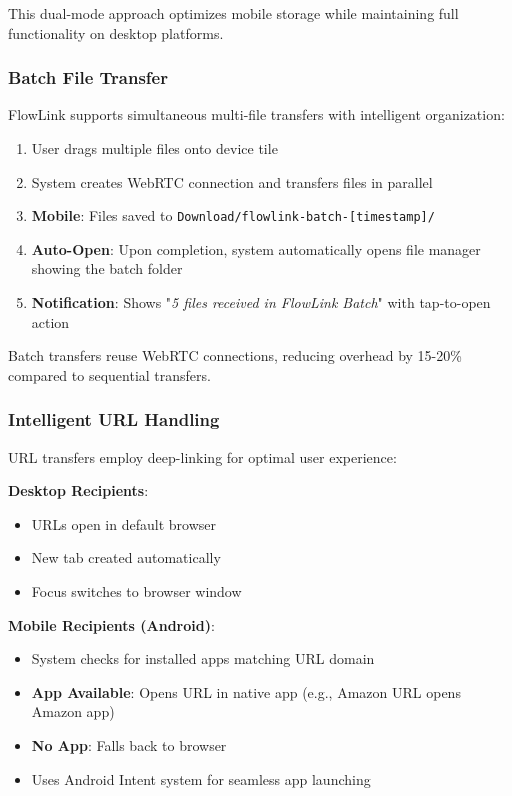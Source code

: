 \documentclass[conference]{IEEEtran}
\begin{document}
This dual-mode approach optimizes mobile storage while maintaining full functionality on desktop platforms.

\subsubsection{Batch File Transfer}

FlowLink supports simultaneous multi-file transfers with intelligent organization:

\begin{enumerate}
    \item User drags multiple files onto device tile
    \item System creates WebRTC connection and transfers files in parallel
    \item \textbf{Mobile}: Files saved to \texttt{Download/flowlink-batch-[timestamp]/}
    \item \textbf{Auto-Open}: Upon completion, system automatically opens file manager showing the batch folder
    \item \textbf{Notification}: Shows "\textit{5 files received in FlowLink Batch}" with tap-to-open action
\end{enumerate}

Batch transfers reuse WebRTC connections, reducing overhead by 15-20\% compared to sequential transfers.

\subsubsection{Intelligent URL Handling}

URL transfers employ deep-linking for optimal user experience:

\textbf{Desktop Recipients}:
\begin{itemize}
    \item URLs open in default browser
    \item New tab created automatically
    \item Focus switches to browser window
\end{itemize}

\textbf{Mobile Recipients (Android)}:
\begin{itemize}
    \item System checks for installed apps matching URL domain
    \item \textbf{App Available}: Opens URL in native app (e.g., Amazon URL opens Amazon app)
    \item \textbf{No App}: Falls back to browser
    \item Uses Android Intent system for seamless app launching
\end{itemize}
\end{document}
